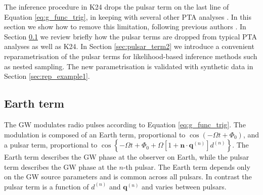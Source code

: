 \documentclass[fleqn,usenatbib,useAMS]{mnras}
\begin{document}
 
The inference procedure in K24 drops the pulsar term on the last line of Equation \eqref{eq:g_func_trig}, in keeping with several other PTA analyses \citep[e.g.][]{Sesana2010,Babak2012,Petiteau2013,Zhu2015,Taylors2016,Goldstein2018,Charisi2023arXiv230403786C}. In this section we show how to remove this limitation, following previous authors \citep{Zhupulsarterms,Chen2022}. In Section \ref{sec:earth_term} we review briefly how the pulsar terms are dropped from typical PTA analyses as well as K24. In Section \ref{sec:pulsar_term2} we introduce a convenient reparametrisation of the pulsar terms for likelihood-based inference methods such as nested sampling. The new parametrisation is validated with synthetic data in Section \ref{sec:rep_example1}.



\subsection{Earth term}\label{sec:earth_term}
The GW modulates radio pulses according to Equation \eqref{eq:g_func_trig}. The modulation is composed of an Earth term, proportional to $\cos(-\Omega t + \Phi_0)$, and a pulsar term, proportional to $\cos \left \{-\Omega t +\Phi_0 + \Omega \left[1 + \boldsymbol{n}\cdot \boldsymbol{q}^{(n)} \right]  d^{(n)} \right \}$. The Earth term describes the GW phase at the observer on Earth, while the pulsar term describes the GW phase at the $n$-th pulsar. The Earth term depends only on the GW source parameters and is common across all pulsars. In contrast the pulsar term is a function of $d^{(n)}$ and $\boldsymbol{q}^{(n)}$ and varies between pulsars. \newline 
\end{document}
